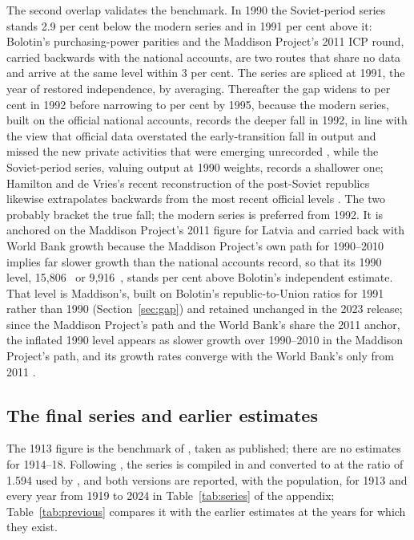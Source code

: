The second overlap validates the benchmark. In 1990 the Soviet-period series stands 2.9 per cent below the modern series and in 1991  per cent above it: Bolotin's purchasing-power parities and the Maddison Project's 2011 ICP round, carried backwards with the national accounts, are two routes that share no data and arrive at the same level within 3 per cent. The series are spliced at 1991, the year of restored independence, by averaging. Thereafter the gap widens to  per cent in 1992 before narrowing to  per cent by 1995, because the modern series, built on the official national accounts, records the deeper fall in 1992, in line with the view that official data overstated the early-transition fall in output and missed the new private activities that were emerging unrecorded \parencites[7, 11]{imf_transition}[260]{kyn_1997_eastern}, while the Soviet-period series, valuing output at 1990 weights, records a shallower one; Hamilton and de Vries's recent reconstruction of the post-Soviet republics likewise extrapolates backwards from the most recent official levels \parencite[17]{hamilton_transition}. The two probably bracket the true fall; the modern series is preferred from 1992. It is anchored on the Maddison Project's 2011 figure for Latvia and carried back with World Bank growth because the Maddison Project's own path for 1990--2010 implies far slower growth than the national accounts record, so that its 1990 level, 15,806~\intltwenty{} or 9,916~\intlnineteen{}, stands  per cent above Bolotin's independent estimate. That level is Maddison's, built on Bolotin's republic-to-Union ratios for 1991 rather than 1990 (Section~\ref{sec:gap}) and retained unchanged in the 2023 release; since the Maddison Project's path and the World Bank's share the 2011 anchor, the inflated 1990 level appears as slower growth over 1990--2010 in the Maddison Project's path, and its growth rates converge with the World Bank's only from 2011 \parencites[57]{klimantas2025thesis}{mpd2023}{wdi2024}.

\subsection{The final series and earlier estimates}

The 1913 figure is the benchmark of \textcite[603]{norkusmark2021}, taken as published; there are no estimates for 1914--18. Following \textcite[30]{bolt_zanden_newgdp2021}, the series is compiled in \intlnineteen{} and converted to \intltwenty{} at the ratio of 1.594 used by \textcite{mpd2023}, and both versions are reported, with the population, for 1913 and every year from 1919 to 2024 in Table~\ref{tab:series} of the appendix; Table~\ref{tab:previous} compares it with the earlier estimates at the years for which they exist.

